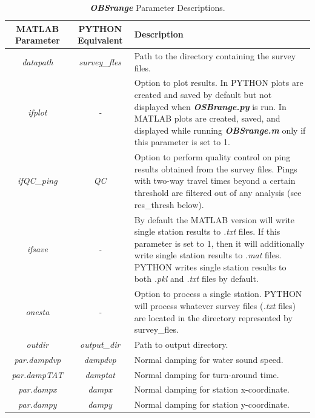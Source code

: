 \documentclass[titlepage]{article}
\begin{document}
  \begin{table}[h!]
   \centering
   \caption{\textbf{\textit{OBSrange}} Parameter Descriptions.}
   \begin{tabularx}{\linewidth}{|c|c|X|}
    \hline
    \textbf{MATLAB Parameter}   & \textbf{PYTHON Equivalent} & \textbf{Description} \\ \hline
    \textit{datapath}           & \textit{survey\_fles}      & Path to the directory containing the survey files.\\ \hline
    \textit{ifplot}             & \textit{-}                 & Option to plot results. In PYTHON plots are created and saved by default but not displayed when \textbf{\textit{OSBrange.py}} is run. In MATLAB plots are created, saved, and displayed while running \textbf{\textit{OBSrange.m}} only if this parameter is set to 1.\\ \hline
    \textit{ifQC\_ping}         & \textit{QC}                & Option to perform quality control on ping results obtained from the survey files. Pings with two-way travel times beyond a certain threshold are filtered out of any analysis (see res\_thresh below).\\ \hline
    \textit{ifsave}             & \textit{-}                 & By default the MATLAB version will write single station results to \textit{.txt} files. If this parameter is set to 1, then it will additionally write single station results to \textit{.mat} files. PYTHON writes single station results to both \textit{.pkl} and \textit{.txt} files by default.\\ \hline
    \textit{onesta}             & \textit{-}                 & Option to process a single station. PYTHON will process whatever survey files (\textit{.txt} files) are located in the directory represented by survey\_fles.\\ \hline
    \textit{outdir}             & \textit{output\_dir}       & Path to output directory.\\ \hline
    \textit{par.dampdvp}        & \textit{dampdvp}           & Normal damping for water sound speed.\\ \hline
    \textit{par.dampTAT}        & \textit{damptat}           & Normal damping for turn-around time.\\ \hline
    \textit{par.dampx}          & \textit{dampx}             & Normal damping for station x-coordinate.\\ \hline
    \textit{par.dampy}          & \textit{dampy}             & Normal damping for station y-coordinate.\\ \hline

\end{tabularx}
\end{table}
\end{document}
